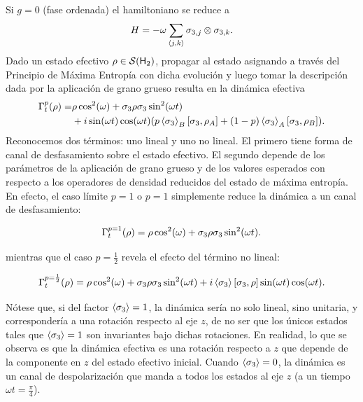 Si $g=0$ (fase ordenada) el hamiltoniano se reduce a
\begin{equation}
    H=-\omega\sum_{\langle j,k \rangle}\sigma_{3,j}\otimes\sigma_{3,k}.\nonumber
\end{equation}
Dado un estado efectivo $\rho\in\mathcal{S}({\sf H}_{2})$, propagar al estado asignando a través del Principio de Máxima Entropía con dicha evolución y luego tomar la descripción dada por la aplicación de grano grueso resulta en la dinámica efectiva
\begin{align*}
    \Gamma_{t}^{p}(\rho)=&\rho \cos^{2}(\omega)+\sigma_{3} \rho \sigma_{3} \sin^{2}(\omega t)\\
    & + i\sin(\omega t)\cos(\omega t)\qty(p\expval{\sigma_{3}}_{B}[\sigma_{3},\rho_{A}]+(1-p)\expval{\sigma_{3}}_{A}[\sigma_{3},\rho_{B}]).
\end{align*}
Reconocemos dos términos: uno lineal y uno no lineal. El primero tiene forma de canal de desfasamiento sobre el estado efectivo. El segundo depende de los parámetros de la aplicación de grano grueso y de los valores esperados con respecto a los operadores de densidad reducidos del estado de máxima entropía. En efecto, el caso límite $p=1$ o $p=1$ simplemente reduce la dinámica a un canal de desfasamiento:

\begin{equation*}
    \Gamma_{t}^{p=1}(\rho)=\rho \cos^{2}(\omega)+\sigma_{3} \rho \sigma_{3} \sin^{2}(\omega t).
\end{equation*}

mientras que el caso $p=\frac{1}{2}$ revela el efecto del término no lineal:

\begin{equation*}
    \Gamma_{t}^{p=\frac{1}{2}}(\rho)=\rho \cos^{2}(\omega)+\sigma_{3} \rho \sigma_{3} \sin^{2}(\omega t) + i\expval{\sigma_{3}} \qty[\sigma_{3},\rho] \sin(\omega t)\cos(\omega t).
\end{equation*}

Nótese que, si del factor $\expval{\sigma_{3}}=1$, la dinámica sería no solo lineal, sino unitaria, y correspondería a una rotación respecto al eje $z$, de no ser que los únicos estados tales que $\expval{\sigma_{3}}=1$ son invariantes bajo dichas rotaciones. En realidad, lo que se observa es que la dinámica efectiva es una rotación respecto a $z$ que depende de la componente en $z$ del estado efectivo inicial. Cuando $\expval{\sigma_{3}}=0$, la dinámica es un canal de despolarización que manda a todos los estados al eje $z$ (a un tiempo $\omega t =\frac{\pi}{4}$). 


